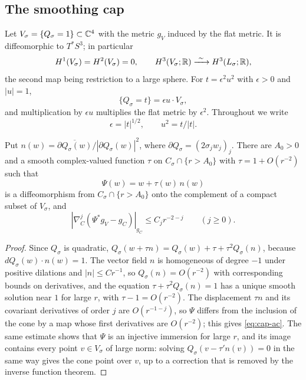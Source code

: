 \subsection{The smoothing cap}
Let $V_\sigma=\{Q_\sigma=1\}\subset\mathbb C^4$ with the metric $g_V$ induced by
the flat metric. It is diffeomorphic to $T^*S^3$; in particular
\begin{equation}\label{eq:cap-topology}
 H^1(V_\sigma)=H^2(V_\sigma)=0,\qquad
 H^3(V_\sigma;\mathbb R)\xrightarrow{\ \sim\ }H^3(L_\sigma;\mathbb R),
\end{equation}
the second map being restriction to a large sphere. For $t=\epsilon^2u^2$
with $\epsilon>0$ and $|u|=1$,
\begin{equation}\label{eq:cap-scaling}
 \{Q_\sigma=t\}=\epsilon u\cdot V_\sigma ,
\end{equation}
and multiplication by $\epsilon u$ multiplies the flat metric by
$\epsilon^2$. Throughout we write
\begin{equation}\label{eq:scale}
 \epsilon=|t|^{1/2},\qquad u^2=t/|t| .
\end{equation}

\begin{lemma}\label{lem:cap-ac}
Put $n(w)=\overline{\partial Q_\sigma(w)}/|\partial Q_\sigma(w)|^2$, where
$\partial Q_\sigma=(2\sigma_jw_j)_j$. There are $A_0>0$ and a smooth
complex-valued function $\tau$ on $C_\sigma\cap\{r>A_0\}$ with
$\tau=1+O(r^{-2})$ such that
\[
 \Psi(w)=w+\tau(w)\,n(w)
\]
is a diffeomorphism from $C_\sigma\cap\{r>A_0\}$ onto the complement of a
compact subset of $V_\sigma$, and
\begin{equation}\label{eq:cap-ac}
 |\nabla_C^j(\Psi^*g_V-g_C)|_{g_C}\le C_jr^{-2-j}\qquad(j\ge0).
\end{equation}
\end{lemma}
\begin{proof}
Since $Q_\sigma$ is quadratic, $Q_\sigma(w+\tau n)=Q_\sigma(w)+\tau
+\tau^2Q_\sigma(n)$, because $dQ_\sigma(w)\cdot n(w)=1$. The vector
field $n$ is homogeneous of degree $-1$ under positive dilations and
$|n|\le Cr^{-1}$, so $Q_\sigma(n)=O(r^{-2})$ with corresponding bounds on
derivatives, and the equation $\tau+\tau^2Q_\sigma(n)=1$ has a
unique smooth solution near $1$ for large $r$, with
$\tau-1=O(r^{-2})$. The displacement $\tau n$ and its covariant
derivatives of order $j$ are $O(r^{-1-j})$, so $\Psi$ differs from the
inclusion of the cone by a map whose first derivatives are $O(r^{-2})$;
this gives \eqref{eq:cap-ac}. The same estimate shows that $\Psi$ is an
injective immersion for large $r$, and its image contains every point
$v\in V_\sigma$ of large norm: solving $Q_\sigma(v-\tau'n(v))=0$ in the
same way gives the cone point over $v$, up to a correction that is
removed by the inverse function theorem.
\end{proof}


